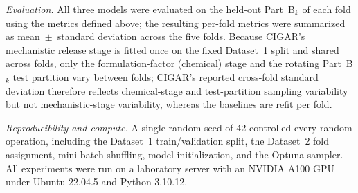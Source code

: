 ﻿\documentclass[a4paper,fleqn]{cas-sc}
\begin{document}
\emph{Evaluation.} All three models were evaluated on the held-out
Part~B$_k$ of each fold using the metrics defined above; the resulting
per-fold metrics were summarized as mean~$\pm$~standard deviation across
the five folds. Because CIGAR's mechanistic release stage is fitted once
on the fixed Dataset~1 split and shared across folds, only the
formulation-factor (chemical) stage and the rotating Part~B$_k$ test
partition vary between folds; CIGAR's reported cross-fold standard
deviation therefore reflects chemical-stage and test-partition sampling
variability but not mechanistic-stage variability, whereas the baselines
are refit per fold.

\emph{Reproducibility and compute.} A single random seed of 42 controlled
every random operation, including the Dataset~1 train/validation split,
the Dataset~2 fold assignment, mini-batch shuffling, model initialization,
and the Optuna sampler. All experiments were run on a laboratory server
with an NVIDIA A100 GPU under Ubuntu 22.04.5 and Python 3.10.12.






\end{document}
